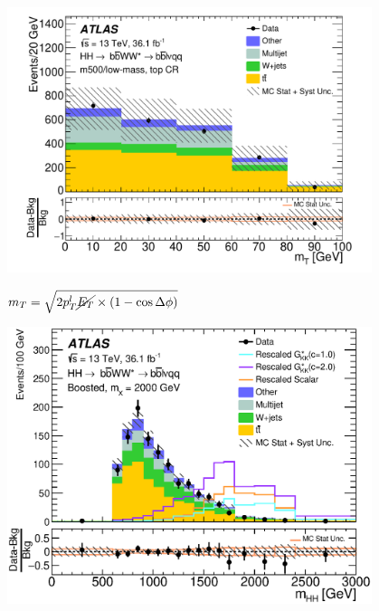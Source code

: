 \documentclass{beamer}
\newcommand*{\met}{\ensuremath{\cancel{E_{T}}}\xspace}
\newcommand*{\header}[1]{\fontsize{16}{8}\selectfont \textbf{{\color{MyPurple}{#1}}}}
\begin{document}
\begin{frame}
\begin{columns}
\begin{column}{0.5\textwidth}
\end{column}
\end{columns}
\end{frame}

\begin{frame}
\begin{center}
\header{Background Shape Check}
\end{center}
\begin{center}
\includegraphics[width=0.8\textwidth]{figures/C_mBBcr_reOpt700_mww_bbpt210_wlepmtben_regionA_met25d020-eps-converted-to}
\end{center}
\small
$m_T = \sqrt{2p_T^l\met\times{}(1-\cos{\Delta{\phi}})}$
\end{frame}

\begin{frame}
\begin{center}
\header{Results}
\end{center}
\begin{center}
\includegraphics[width=0.8\textwidth]{figures/C_2tab_0bjet_SR_lepton_presel_met50_hhMassRebin1_postfit}
\end{center}
\end{frame}
\end{document}

